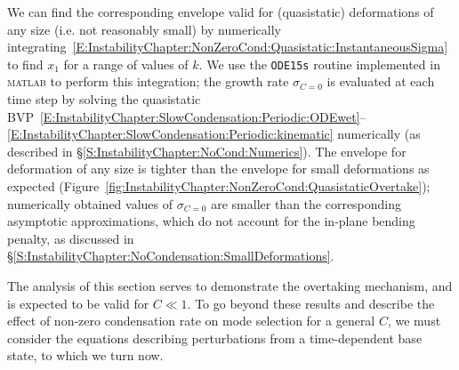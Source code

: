 We can find the corresponding envelope valid for (quasistatic) deformations of any size (i.e. not reasonably small) by numerically integrating~\eqref{E:InstabilityChapter:NonZeroCond:Quasistatic:InstantaneousSigma} to find $x_1$ for a range of values of $k$. We use the \texttt{ODE15s} routine implemented in \textsc{matlab} to perform this integration; the growth rate $\sigma_{C=0}$ is evaluated at each time step by solving the quasistatic BVP~\eqref{E:InstabilityChapter:SlowCondensation:Periodic:ODEwet}--\eqref{E:InstabilityChapter:SlowCondensation:Periodic:kinematic} numerically (as described in \S\ref{S:InstabilityChapter:NoCond:Numerics}). The envelope for deformation of any size is tighter than the envelope for small deformations as expected (Figure~\ref{fig:InstabilityChapter:NonZeroCond:QuasistaticOvertake}); numerically obtained values of $\sigma_{C=0}$ are smaller than the corresponding asymptotic approximations, which do not account for the in-plane bending penalty, as discussed in \S\ref{S:InstabilityChapter:NoCondensation:SmallDeformations}.

The analysis of this section serves to demonstrate the overtaking mechanism, and is expected to be valid for $C \ll 1$. To go beyond these results and describe the effect of non-zero condensation rate on mode selection for a general $C$, we must consider the equations describing perturbations from a time-dependent base state, to which we turn now.


